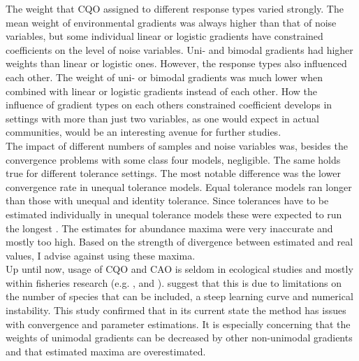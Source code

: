 	The weight that CQO assigned to different response types varied strongly.
	The mean weight of environmental gradients was always higher than that of noise variables, but some individual linear or logistic gradients have constrained coefficients on the level of noise variables.  
	Uni- and bimodal gradients had higher weights than linear or logistic ones. 
	However, the response types also influenced each other. 
	The weight of uni- or bimodal gradients was much lower when combined with linear or logistic gradients instead of each other.
	How the influence of gradient types on each others constrained coefficient develops in settings with more than just two variables, as one would expect in actual communities, would be an interesting avenue for further studies. \\
	The impact of different numbers of samples and noise variables was, besides the convergence problems with some class four models, negligible.
	The same holds true for different tolerance settings. 
	The most notable difference was the lower convergence rate in unequal tolerance models.
	Equal tolerance models ran longer than those with unequal and identity tolerance. 
	Since tolerances have to be estimated individually in unequal tolerance models these were expected to run the longest \citep{yee2015vector}.  
	The estimates for abundance maxima were very inaccurate and mostly too high. Based on the strength of divergence between estimated and real values, I advise against using these maxima.\\
	Up until now, usage of CQO and CAO is seldom in ecological studies and mostly within fisheries research (e.g. \citet{Vilizzi2012}, \citet{Top2016} and \citet{Carosi2017}). 
	\citet{TerBraak2015} suggest that this is due to limitations on the number of species that can be included, a steep learning curve and numerical instability. 
	This study confirmed that in its current state the method has issues with convergence and parameter estimations. 
	It is especially concerning that the weights of unimodal gradients can be decreased by other non-unimodal gradients and that estimated maxima are overestimated. \\ 


